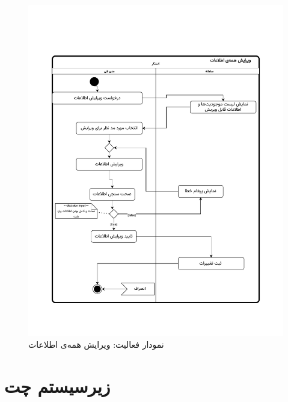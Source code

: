 \begin{figure}[ht!]
	\centering
	\includegraphics[scale=0.8, page=1]{figs/OOD-activity-editall.pdf}
	\caption{نمودار فعالیت: ویرایش همه‌ی اطلاعات}
\end{figure}
\FloatBarrier
\newpage



\section{زیرسیستم چت}


